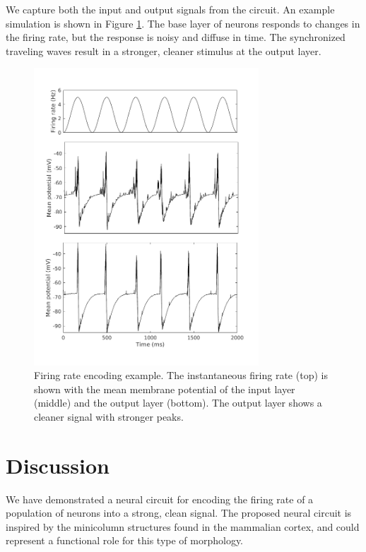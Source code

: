 \documentclass[a4paper,11pt]{article}
\begin{document}
We capture both the input and output signals from the circuit.
An example simulation is shown in Figure \ref{fig:firingrate_example}.
The base layer of neurons responds to changes in the firing rate, but the response is noisy and diffuse in time.
The synchronized traveling waves result in a stronger, cleaner stimulus at the output layer.

\begin{figure}[!ht]
 \caption{Firing rate encoding example. The instantaneous firing rate (top) is shown with the mean membrane potential of the input layer (middle) and the output layer (bottom). The output layer shows a cleaner signal with stronger peaks.}
 \label{fig:firingrate_example}
 \centering
   \includegraphics[width=0.75\textwidth]{fig/FiringRateEncodingExample}
\end{figure}

\clearpage
\section{Discussion}
We have demonstrated a neural circuit for encoding the firing rate of a population of neurons into a strong, clean signal.
The proposed neural circuit is inspired by the minicolumn structures found in the mammalian cortex, and could represent a functional role for this type of morphology.


\clearpage
\printbibliography
\end{document}
